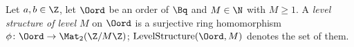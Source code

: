 Let $a,b\in\Z$, let $\Oord$ be an order of $\Bq$ and $M\in\N$ with $M\ge1$. A \emph{level structure of level $M$} on $\Oord$ is a
surjective ring homomorphism $\phi\colon\Oord\to\Mat_2(\Z/M\Z)$; $\operatorname{LevelStructure}(\Oord,M)$ denotes the set of them.
